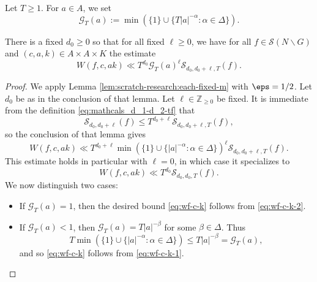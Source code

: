 Let $T \geq 1$.  For $a \in A$, we set
\begin{equation*}
  \mathcal{G}_T(a) :=
  \min (\{ 1 \} \cup \{ T |a|^{-\alpha} : \alpha \in \Delta \}).
\end{equation*}
\begin{lemma}\label{lem:sub-gln:there-fixed-d_0}
  There is a fixed $d_0 \geq 0$ so that for all fixed $\ell \geq 0$, we have for all $f \in \mathcal{S}(N \backslash G)$ and $(c,a,k) \in A \times  A \times K$ the estimate
  \begin{equation}\label{eq:wf-c-k}
    W(f,c,a k) \ll
    T^{d_0} \mathcal{G}_T(a)^{\ell} \mathcal{S}_{d_0, d_0 + \ell, T}(f).
  \end{equation}

\end{lemma}
\begin{proof}
  We apply Lemma \ref{lem:scratch-research:each-fixed-m} with $\eps = 1/2$.  Let $d_0$ be as in the conclusion of that lemma.  Let $\ell \in \mathbb{Z}_{\geq 0}$ be fixed.  It is immediate from the definition \eqref{eq:mathcals_d_1-d_2-tf} that
  \begin{equation*}
    \mathcal{S}_{d_0, d_0 + \ell}(f) \leq T^{d_0 + \ell} \mathcal{S}_{d_0, d_0 + \ell, T}(f),
  \end{equation*}
  so the conclusion of that lemma gives
  \begin{equation}\label{eq:wf-c-k-1}
    W(f,c,a k) \ll
    T^{d_0 + \ell}
    \min (\{1\} \cup \{|a|^{-\alpha} : \alpha \in \Delta \})^{\ell} \mathcal{S}_{d_0, d_0 + \ell, T}(f).
  \end{equation}
  This estimate holds in particular with $\ell = 0$, in which case it specializes to
  \begin{equation}\label{eq:wf-c-k-2}
    W(f,c,a k) \ll
    T^{d_0}
    \mathcal{S}_{d_0,d_0,T}(f).
  \end{equation}
  We now distinguish two cases:
  \begin{itemize}
  \item If $\mathcal{G}_T(a) = 1$, then the desired bound \eqref{eq:wf-c-k} follows from \eqref{eq:wf-c-k-2}.
  \item If $\mathcal{G}_T(a) < 1$, then $\mathcal{G}_T(a) = T |a|^{-\beta}$ for some $\beta \in \Delta$.  Thus
    \begin{equation*}
      T
      \min
      (\{1\} \cup \{|a|^{-\alpha} : \alpha \in \Delta \})
      \leq T |a|^{-\beta} = \mathcal{G}_T(a),
    \end{equation*}
    and so \eqref{eq:wf-c-k} follows from \eqref{eq:wf-c-k-1}.
  \end{itemize}
\end{proof}


